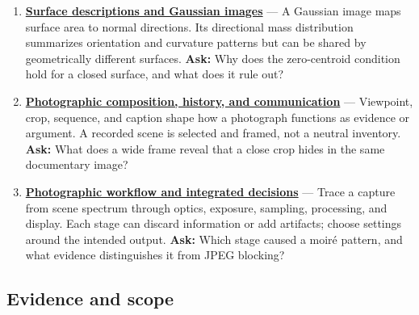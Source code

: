 \begin{enumerate}
  \textbf{\href{Continuous\%20Notes/University\%20-\%20Worlds,\%20Images\%20and\%20Inference\%20-\%20Graphics,\%20Vision\%20and\%20Photography\#Shape\%20from\%20shading\%20and\%20reflectance}{Shape from shading and reflectance}} --- A single shading image gives a nonlinear relation among surface normal, reflectance, and illumination; integration into height requires boundary conditions and extra assumptions. \textbf{Ask:} Why does a locally valid normal field fail to guarantee one globally consistent surface?
\item
  \textbf{\href{Continuous\%20Notes/University\%20-\%20Worlds,\%20Images\%20and\%20Inference\%20-\%20Graphics,\%20Vision\%20and\%20Photography\#Surface\%20descriptions\%20and\%20Gaussian\%20images}{Surface descriptions and Gaussian images}} --- A Gaussian image maps surface area to normal directions. Its directional mass distribution summarizes orientation and curvature patterns but can be shared by geometrically different surfaces. \textbf{Ask:} Why does the zero-centroid condition hold for a closed surface, and what does it rule out?
\item
  \textbf{\href{Continuous\%20Notes/University\%20-\%20Worlds,\%20Images\%20and\%20Inference\%20-\%20Graphics,\%20Vision\%20and\%20Photography\#Photographic\%20composition,\%20history,\%20and\%20communication}{Photographic composition, history, and communication}} --- Viewpoint, crop, sequence, and caption shape how a photograph functions as evidence or argument. A recorded scene is selected and framed, not a neutral inventory. \textbf{Ask:} What does a wide frame reveal that a close crop hides in the same documentary image?
\item
  \textbf{\href{Continuous\%20Notes/University\%20-\%20Worlds,\%20Images\%20and\%20Inference\%20-\%20Graphics,\%20Vision\%20and\%20Photography\#Photographic\%20workflow\%20and\%20integrated\%20decisions}{Photographic workflow and integrated decisions}} --- Trace a capture from scene spectrum through optics, exposure, sampling, processing, and display. Each stage can discard information or add artifacts; choose settings around the intended output. \textbf{Ask:} Which stage caused a moiré pattern, and what evidence distinguishes it from JPEG blocking?
\end{enumerate}

\subsection{Evidence and scope}\label{evidence-and-scope}

